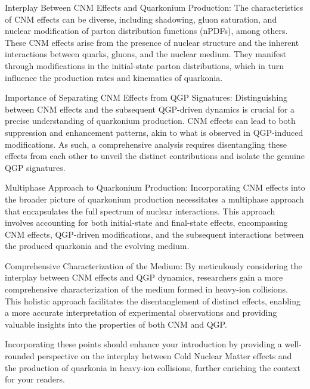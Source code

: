 Interplay Between CNM Effects and Quarkonium Production:
The characteristics of CNM effects can be diverse, including shadowing, gluon saturation, and nuclear modification of parton distribution functions (nPDFs), among others. These CNM effects arise from the presence of nuclear structure and the inherent interactions between quarks, gluons, and the nuclear medium. They manifest through modifications in the initial-state parton distributions, which in turn influence the production rates and kinematics of quarkonia.

Importance of Separating CNM Effects from QGP Signatures:
Distinguishing between CNM effects and the subsequent QGP-driven dynamics is crucial for a precise understanding of quarkonium production. CNM effects can lead to both suppression and enhancement patterns, akin to what is observed in QGP-induced modifications. As such, a comprehensive analysis requires disentangling these effects from each other to unveil the distinct contributions and isolate the genuine QGP signatures.

Multiphase Approach to Quarkonium Production:
Incorporating CNM effects into the broader picture of quarkonium production necessitates a multiphase approach that encapsulates the full spectrum of nuclear interactions. This approach involves accounting for both initial-state and final-state effects, encompassing CNM effects, QGP-driven modifications, and the subsequent interactions between the produced quarkonia and the evolving medium.

Comprehensive Characterization of the Medium:
By meticulously considering the interplay between CNM effects and QGP dynamics, researchers gain a more comprehensive characterization of the medium formed in heavy-ion collisions. This holistic approach facilitates the disentanglement of distinct effects, enabling a more accurate interpretation of experimental observations and providing valuable insights into the properties of both CNM and QGP.

Incorporating these points should enhance your introduction by providing a well-rounded perspective on the interplay between Cold Nuclear Matter effects and the production of quarkonia in heavy-ion collisions, further enriching the context for your readers.
